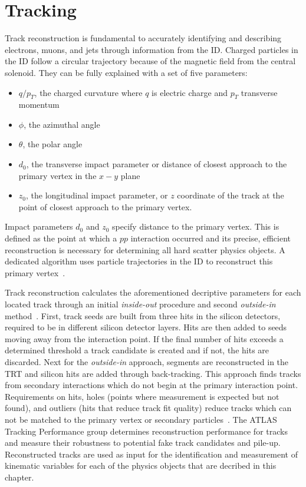 \section{Tracking}
\label{sec:tracking}
Track reconstruction is fundamental to accurately identifying and describing electrons, muons, and jets through information from the ID. Charged particles in the ID follow a circular trajectory because of the magnetic field from the central solenoid. They can be fully explained with a set of five parameters:
\begin{itemize}
\item $q/p_T$, the charged curvature where $q$ is electric charge and $p_T$ transverse momentum
\item $\phi$, the azimuthal angle
\item $\theta$, the polar angle
\item $d_0$, the transverse impact parameter or distance of closest approach to the primary vertex in the $x-y$ plane
\item $z_0$, the longitudinal impact parameter, or $z$ coordinate of the track at the point of closest approach to the primary vertex. 
\end{itemize}
Impact parameters $d_0$ and $z_0$ specify distance to the primary vertex. This is defined as the point at which a $pp$ interaction occurred and its precise, efficient reconstruction is necessary for determining all hard scatter physics objects. A dedicated algorithm uses particle trajectories in the ID to reconstruct this primary vertex~\cite{primaryvertex}. 

Track reconstruction calculates the aforementioned decriptive parameters for each located track through an initial \textit{inside-out} procedure and second \textit{outside-in} method~\cite{tracking}. First, track seeds are built from three hits in the silicon detectors, required to be in different silicon detector layers. Hits are then added to seeds moving away from the interaction point. If the final number of hits exceeds a determined threshold a track candidate is created and if not, the hits are discarded. Next for the \textit{outside-in} approach, segments are reconstructed in the TRT and silicon hits are added  through back-tracking. This approach finds tracks from secondary interactions which do not begin at the primary interaction point. Requirements on hits, holes (points where measurement is expected but not found), and outliers (hits that reduce track fit quality) reduce tracks which can not be matched to the primary vertex or secondary particles~\cite{IDreconstruction}. The ATLAS Tracking Performance group determines reconstruction performance for tracks and measure their robustness to potential fake track candidates and pile-up. Reconstructed tracks are used as input for the identification and measurement of kinematic variables for each of the physics objects that are decribed in this chapter. 

